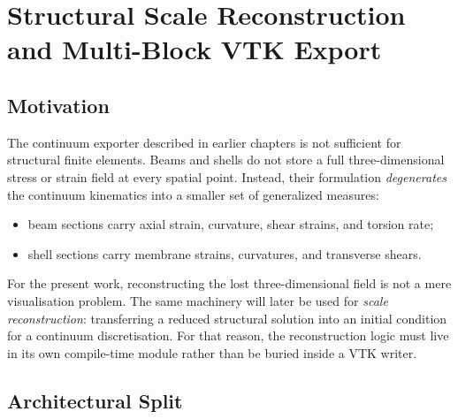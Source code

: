 \chapter{Structural Scale Reconstruction and Multi-Block VTK Export}

\section{Motivation}

The continuum exporter described in earlier chapters is not sufficient for
structural finite elements.  Beams and shells do not store a full
three-dimensional stress or strain field at every spatial point.  Instead,
their formulation \emph{degenerates} the continuum kinematics into a smaller
set of generalized measures:
\begin{itemize}
  \item beam sections carry axial strain, curvature, shear strains, and
        torsion rate;
  \item shell sections carry membrane strains, curvatures, and transverse
        shears.
\end{itemize}

For the present work, reconstructing the lost three-dimensional field is not a
mere visualisation problem.  The same machinery will later be used for
\emph{scale reconstruction}: transferring a reduced structural solution into an
initial condition for a continuum discretisation.  For that reason, the
reconstruction logic must live in its own compile-time module rather than be
buried inside a VTK writer.

\section{Architectural Split}

